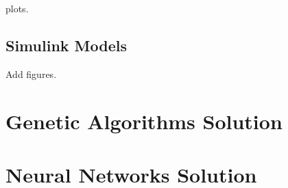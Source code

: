 plots.
\subsection{Simulink Models}

Add figures.

\section{Genetic Algorithms Solution}

\section{Neural Networks Solution}
